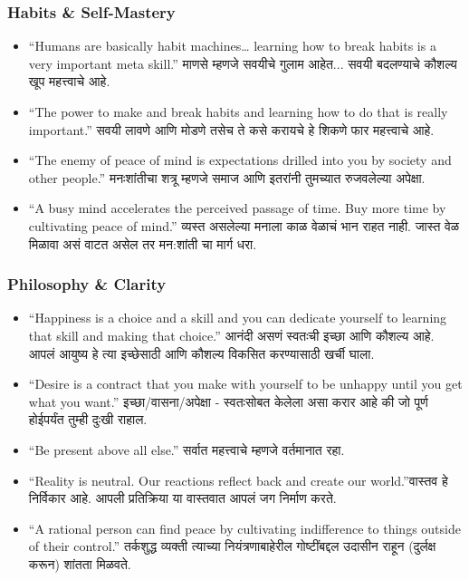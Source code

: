 \begin{frame}[fragile]\frametitle{Habits \& Self-Mastery}
\begin{itemize}
    \item ``Humans are basically habit machines… learning how to break habits is a very important meta skill.'' माणसे म्हणजे सवयीचे गुलाम आहेत... सवयी बदलण्याचे कौशल्य खूप महत्त्वाचे आहे.

    \item ``The power to make and break habits and learning how to do that is really important.'' सवयी लावणे आणि मोडणे तसेच ते कसे करायचे हे शिकणे फार महत्त्वाचे आहे.

    \item ``The enemy of peace of mind is expectations drilled into you by society and other people.'' मनःशांतीचा शत्रू म्हणजे समाज आणि इतरांनी तुमच्यात रुजवलेल्या अपेक्षा.

    \item ``A busy mind accelerates the perceived passage of time. Buy more time by cultivating peace of mind.'' व्यस्त असलेल्या मनाला काळ वेळाचं भान राहत नाही. जास्त वेळ मिळावा असं वाटत असेल तर मन:शांती चा मार्ग धरा.
\end{itemize}
\end{frame}


\begin{frame}[fragile]\frametitle{Philosophy \& Clarity}
\begin{itemize}
    \item ``Happiness is a choice and a skill and you can dedicate yourself to learning that skill and making that choice.'' आनंदी असणं स्वतःची इच्छा आणि कौशल्य आहे. आपलं आयुष्य हे त्या इच्छेसाठी आणि कौशल्य विकसित करण्यासाठी खर्ची घाला.

    \item ``Desire is a contract that you make with yourself to be unhappy until you get what you want.'' इच्छा/वासना/अपेक्षा - स्वतःसोबत केलेला असा करार आहे की जो पूर्ण होईपर्यंत तुम्ही दुःखी राहाल.

    \item ``Be present above all else.'' सर्वात महत्त्वाचे म्हणजे वर्तमानात रहा.

    \item ``Reality is neutral. Our reactions reflect back and create our world.''वास्तव हे निर्विकार आहे. आपली प्रतिक्रिया या वास्तवात आपलं जग निर्माण करते.

    \item ``A rational person can find peace by cultivating indifference to things outside of their control.'' तर्कशुद्ध व्यक्ती त्याच्या नियंत्रणाबाहेरील गोष्टींबद्दल उदासीन राहून (दुर्लक्ष करून) शांतता मिळवते.
\end{itemize}
\end{frame}

